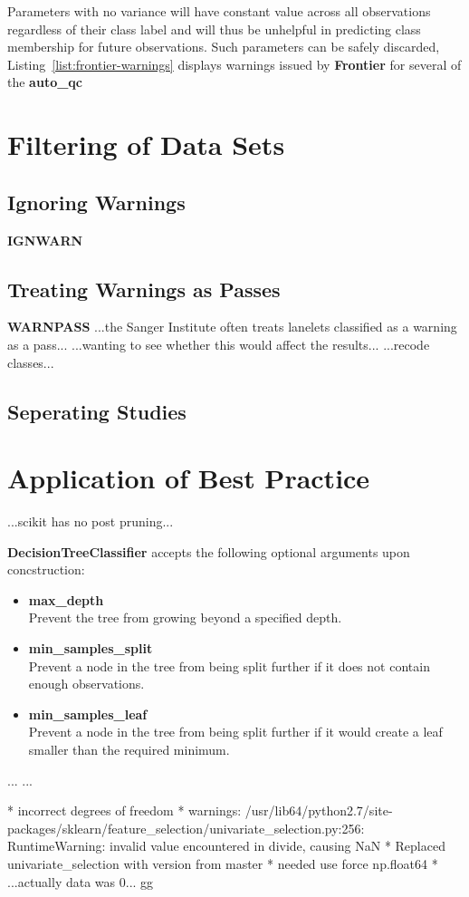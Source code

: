 Parameters with no variance will have constant value across all observations
regardless of their class label and will thus be unhelpful in predicting class
membership for future observations. Such parameters can be safely discarded,
Listing~\ref{list:frontier-warnings} displays warnings issued by
\textbf{Frontier} for several of the \textbf{auto\_qc}


\section{Filtering of Data Sets}
\subsection{Ignoring Warnings}
\textbf{IGNWARN}

\subsection{Treating Warnings as Passes}
\textbf{WARNPASS}
...the Sanger Institute often treats lanelets classified as a warning as a
pass... ...wanting to see whether this would affect the results...
...recode classes...

\subsection{Seperating Studies}

\section{Application of Best Practice}
...scikit has no post pruning...

\textbf{DecisionTreeClassifier} accepts the following optional arguments upon
concstruction:

\begin{itemize}
    \item \textbf{max\_depth} \hfill\\
        Prevent the tree from growing beyond a specified depth.
    \item \textbf{min\_samples\_split} \hfill\\
        Prevent a node in the tree from being split further if it does not
        contain enough observations.
    \item \textbf{min\_samples\_leaf} \hfill\\
        Prevent a node in the tree from being split further if it would create a
        leaf smaller than the required minimum.
\end{itemize}


...
...

* incorrect degrees of freedom
* warnings: /usr/lib64/python2.7/site-packages/sklearn/feature\_selection/univariate\_selection.py:256: RuntimeWarning: invalid value encountered in divide, causing NaN
* Replaced univariate\_selection with version from master
* needed use force np.float64
* ...actually data was 0... gg

